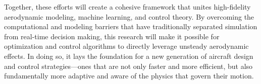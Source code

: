 \documentclass[12pt, letterpaper]{article}
\begin{document}
Together, these efforts will create a cohesive framework that unites high-fidelity aerodynamic modeling, machine learning, and control theory. By overcoming the computational and modeling barriers that have traditionally separated simulation from real-time decision making, this research will make it possible for optimization and control algorithms to directly leverage unsteady aerodynamic effects. In doing so, it lays the foundation for a new generation of aircraft design and control strategies—ones that are not only faster and more efficient, but also fundamentally more adaptive and aware of the physics that govern their motion.








 


\pagebreak



\end{document}
